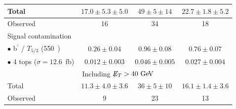 \begin{table}[p]
\begin{center}
\begin{tabular}{l|c|c|c}
      \hline
      Total & $17.0 \pm 5.3 \pm 5.0$ & $49 \pm 5 \pm 14$ & $22.7 \pm 1.8 \pm 5.2$ \\
      \hline
      Observed & 16 & 34 & 18 \\
      \hline
      Signal contamination & & & \\
      $\bullet$ b$^\prime$ / $T_{5/3}$ (550~\GeV{}) & $0.26\pm0.04$ & $0.96\pm0.08$ & $0.76\pm0.07$ \\
      $\bullet$ 4 tops ($\sigma=12.6$~fb) & $0.012\pm0.003$ & $0.046\pm0.005$ & $0.027\pm0.004$ \\
      \hline
      \multicolumn{4}{c}{Including $\met{}>40 \GeV$} \\
      \hline
      Total & $11.3 \pm 4.0 \pm 3.6$ & $36 \pm 5 \pm 10$ & $16.1 \pm 1.4 \pm 3.6$ \\
      \hline
      Observed & 9 & 23 & 13 \\
      \hline
    \end{tabular}

    \vspace{1cm}


\end{center}
\end{table}

